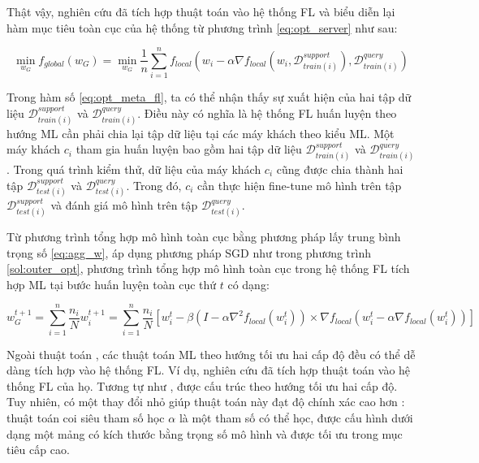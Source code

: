 Thật vậy, nghiên cứu \cite{fallah2020personalized} đã tích hợp thuật toán  vào hệ thống FL và biểu diễn lại hàm mục tiêu toàn cục của hệ thống từ phương trình \ref{eq:opt_server} như sau:

\begin{equation}
    \label{eq:opt_meta_fl}
    \min_{w_G} f_{global}(w_G)
        =\min_{w_G} \frac{1}{n} \sum_{i=1}^n f_{local}\left(w_i - \alpha \nabla f_{local}(w_i, \mathcal{D}_{train(i)}^{support}), \mathcal{D}_{train(i)}^{query}\right)
\end{equation}

Trong hàm số \ref{eq:opt_meta_fl}, ta có thể nhận thấy sự xuất hiện của hai tập dữ liệu $\mathcal{D}_{train(i)}^{support}$ và $\mathcal{D}_{train(i)}^{query}$. Điều này có nghĩa là hệ thống FL huấn luyện theo hướng ML cần phải chia lại tập dữ liệu tại các máy khách theo kiểu ML. Một máy khách $c_i$ tham gia huấn luyện bao gồm hai tập dữ liệu $\mathcal{D}_{train(i)}^{support}$ và $\mathcal{D}_{train(i)}^{query}$. Trong quá trình kiểm thử, dữ liệu của máy khách $c_i$ cũng được chia thành hai tập $\mathcal{D}_{test(i)}^{support}$ và $\mathcal{D}_{test(i)}^{query}$. Trong đó, $c_i$ cần thực hiện fine-tune mô hình trên tập $\mathcal{D}_{test(i)}^{support}$ và đánh giá mô hình trên tập $\mathcal{D}_{test(i)}^{query}$.

Từ phương trình tổng hợp mô hình toàn cục bằng phương pháp lấy trung bình trọng số \ref{eq:agg_w}, áp dụng phương pháp SGD như trong phương trình \ref{sol:outer_opt}, phương trình tổng hợp mô hình toàn cục trong hệ thống FL tích hợp ML tại bước huấn luyện toàn cục thứ $t$ có dạng:

\begin{dmath}
    \label{eq:agg_fedmeta}
    w_G^{t+1} = \sum_{i=1}^n{\frac{n_i}{N} w_i^{t+1}}
        = \sum_{i=1}^n{\frac{n_i}{N}\left[ w_i^t - \beta \left( I - \alpha \nabla^2 f_{local}(w_i^t) \right) \times \nabla f_{local}\left( w_i^t - \alpha\nabla f_{local}(w_i^t)\right) \right]}
\end{dmath}

Ngoài thuật toán , các thuật toán ML theo hướng tối ưu hai cấp độ đều có thể dễ dàng tích hợp vào hệ thống FL. Ví dụ, nghiên cứu \cite{chen2018federated} đã tích hợp thuật toán  vào hệ thống FL của họ. Tương tự như ,  được cấu trúc theo hướng tối ưu hai cấp độ. Tuy nhiên, có một thay đổi nhỏ giúp thuật toán này đạt độ chính xác cao hơn : thuật toán coi siêu tham số học $\alpha$ là một tham số có thể học, được cấu hình dưới dạng một mảng có kích thước bằng trọng số mô hình và được tối ưu trong mục tiêu cấp cao.

